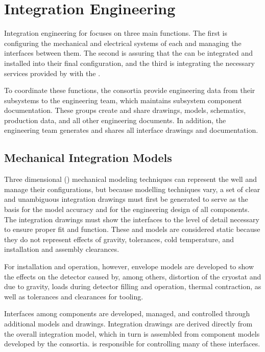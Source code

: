 \section{Integration Engineering}
\label{sec:es-coord-integ-sysengr}

Integration engineering for  focuses on three main functions. The first is configuring the
mechanical and electrical systems of each  and managing
the interfaces between them.  The second 
is assuring that the  can be integrated and
installed into their final configuration, and the third is
integrating the necessary services provided by  
with the . 

To coordinate these functions, the consortia provide engineering data from their
subsystems to the  engineering team, which maintains subsystem
component documentation.  
These groups create and share
drawings, models, schematics, production data, and all other
engineering documents. In addition, the  engineering team
generates and shares all interface drawings and documentation.
 
\subsection{Mechanical Integration Models}
\label{sec:es-tc-mech}

Three dimensional (\threed) mechanical modeling techniques can represent the  well and manage their configurations, but because  \threed modelling techniques vary, a set
of clear and unambiguous \twod integration drawings must first be generated to serve as
the basis for the \threed model accuracy and for the engineering
design of all components. The \twod integration drawings must show the 
interfaces to the level of detail necessary to ensure proper fit and function.  These \threed and 
\twod models are considered static because they do not represent effects of gravity, tolerances, cold
temperature, and installation and assembly clearances.

For installation and operation, however, envelope models  are developed to 
show the effects on the detector 
caused by, among others, distortion of the cryostat and  due to gravity, loads  during 
detector filling and operation, thermal contraction,  as well as tolerances and clearances for tooling.

Interfaces among components are developed, managed, and controlled through additional models and drawings. 
Integration drawings are derived directly from the overall
integration model, which in turn is assembled from
component models developed by the consortia.
 is responsible for controlling many of these interfaces. 

